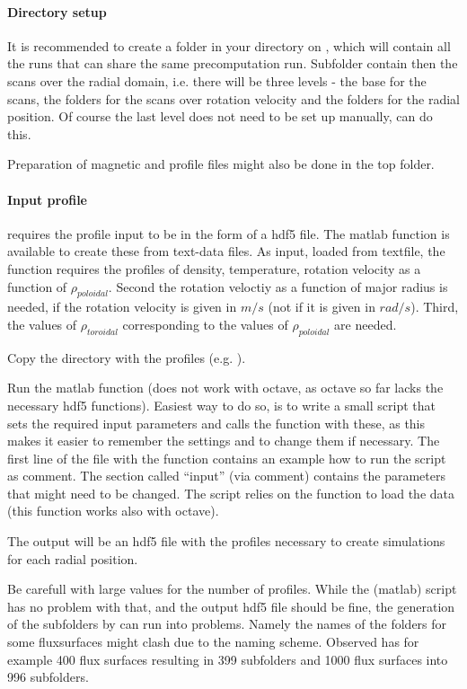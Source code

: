\paragraph{Directory setup}
It is recommended to create a folder in your directory on ,
which will contain all the runs that can share the same precomputation
run. Subfolder contain then the scans over the radial domain, i.e. there
will be three levels - the base for the scans, the folders for the scans
over rotation velocity and the folders for the radial position. Of
course the last level does not need to be set up manually, \neotwo can
do this.

Preparation of magnetic and profile files might also be done in the top
folder.

\paragraph{Input profile}
\neotwo requires the profile input to be in the form of a hdf5 file. The
matlab function  is available to create
these from text-data files. As input, loaded from textfile, the function
requires the profiles of density, temperature, rotation velocity as a
function of $\rho_{poloidal}$. Second the rotation veloctiy as a
function of major radius is needed, if the rotation velocity is given in
$m/s$ (not if it is given in $rad/s$). Third, the values of
$\rho_{toroidal}$ corresponding to the values of $\rho_{poloidal}$ are
needed.

Copy the directory with the profiles (e.g. ).

Run the matlab function  (does not
work with octave, as octave so far lacks the necessary hdf5 functions).
Easiest way to do so, is to write a small script that sets the required
input parameters and calls the function with these, as this makes it
easier to remember the settings and to change them if necessary.
The first line of the file with the function contains an example how to
run the script as comment.
The section called ``input'' (via comment) contains the parameters that
might need to be changed. The script relies on the function
 to load the data (this function works also with
octave).

The output will be an hdf5 file with the profiles necessary to create
simulations for each radial position.

Be carefull with large values for the number of profiles. While the
(matlab) script has no problem with that, and the output hdf5 file
should be fine, the generation of the subfolders by \neotwo can run into
problems. Namely the names of the folders for some fluxsurfaces might
clash due to the naming scheme.
Observed has for example 400 flux surfaces resulting in 399 subfolders
and 1000 flux surfaces into 996 subfolders.

